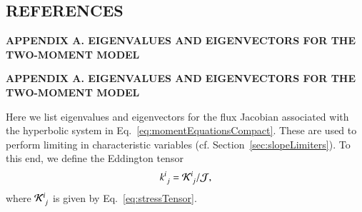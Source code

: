 \documentclass[11pt,letterpaper,twoside,english,final]{article}
\begin{document}
\newpage
\clearemptydoublepage


\newpage
\clearemptydoublepage

\begin{center}
\section{REFERENCES}
\end{center}





\clearemptydoublepage

\newpage

\renewcommand{\thepage}{A-\arabic{page}} 
\setcounter{page}{1}
\thispagestyle{empty}

\vspace*{4in}
{}
\begin{center}
{\bf\Large{APPENDIX A. EIGENVALUES AND EIGENVECTORS FOR THE TWO-MOMENT MODEL}}
\end{center}

\clearemptydoublepage

\newpage

\renewcommand{\thepage}{A-\arabic{page}} 
\setcounter{page}{3}

\begin{center}
{\bf\large {APPENDIX A.  EIGENVALUES AND EIGENVECTORS FOR THE TWO-MOMENT MODEL}}
\end{center}

\label{sec:eigenstructure}

Here we list eigenvalues and eigenvectors for the flux Jacobian associated with the hyperbolic system in Eq.~\eqref{eq:momentEquationsCompact}.  
These are used to perform limiting in characteristic variables (cf. Section~\ref{sec:slopeLimiters}).  
To this end, we define the Eddington tensor
\begin{equation}
  k^{i}_{~j}=\mathcal{K}^{i}_{~j}/\mathcal{J},
\end{equation}
where $\mathcal{K}^{i}_{~j}$ is given by Eq.~\eqref{eq:stressTensor}.  
\end{document}

